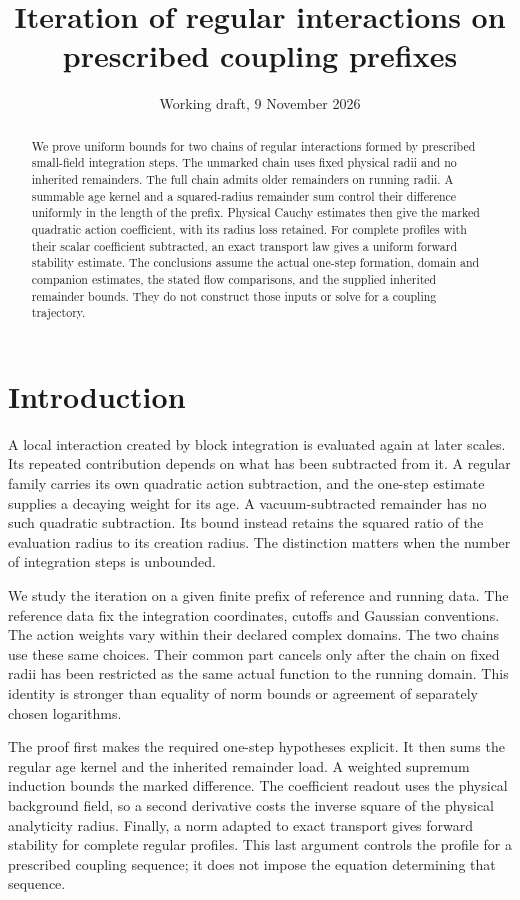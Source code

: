 \documentclass[11pt,letterpaper,reqno]{amsart}
\title[Iteration of regular interactions]{Iteration of regular interactions on prescribed coupling prefixes}
\date{Working draft, 9 November 2026}
\numberwithin{equation}{section}
\theoremstyle{definition}
\theoremstyle{remark}
\begin{document}
\raggedbottom
\begin{abstract}
We prove uniform bounds for two chains of regular interactions formed
by prescribed small-field integration steps. The unmarked chain uses
fixed physical radii and no inherited remainders. The full chain
admits older remainders on running radii. A summable age kernel and
a squared-radius remainder sum control their difference uniformly
in the length of the prefix. Physical Cauchy estimates then give the
marked quadratic action coefficient, with its radius loss retained.
For complete profiles with their scalar coefficient subtracted,
an exact transport law gives a uniform forward stability estimate.
The conclusions assume the actual one-step formation, domain and
companion estimates, the stated flow comparisons, and the supplied
inherited remainder bounds. They do not construct those inputs or
solve for a coupling trajectory.
\end{abstract}
\maketitle
\tableofcontents

\section{Introduction}

A local interaction created by block integration is evaluated again
at later scales. Its repeated contribution depends on what has been
subtracted from it. A regular family carries its own quadratic action
subtraction, and the one-step estimate supplies a decaying weight
for its age. A vacuum-subtracted remainder has no such quadratic
subtraction. Its bound instead retains the squared ratio of the
evaluation radius to its creation radius. The distinction matters
when the number of integration steps is unbounded.

We study the iteration on a given finite prefix of reference and
running data. The reference data fix the integration coordinates,
cutoffs and Gaussian conventions. The action weights vary within
their declared complex domains. The two chains use these same
choices. Their common part cancels only after the chain on fixed
radii has been restricted as the same actual function to the
running domain. This identity is stronger than equality of norm
bounds or agreement of separately chosen logarithms.

The proof first makes the required one-step hypotheses explicit.
It then sums the regular age kernel and the inherited remainder
load. A weighted supremum induction bounds the marked difference.
The coefficient readout uses the physical background field, so a
second derivative costs the inverse square of the physical
analyticity radius. Finally, a norm adapted to exact transport
gives forward stability for complete regular profiles. This last
argument controls the profile for a prescribed coupling sequence;
it does not impose the equation determining that sequence.
\end{document}
